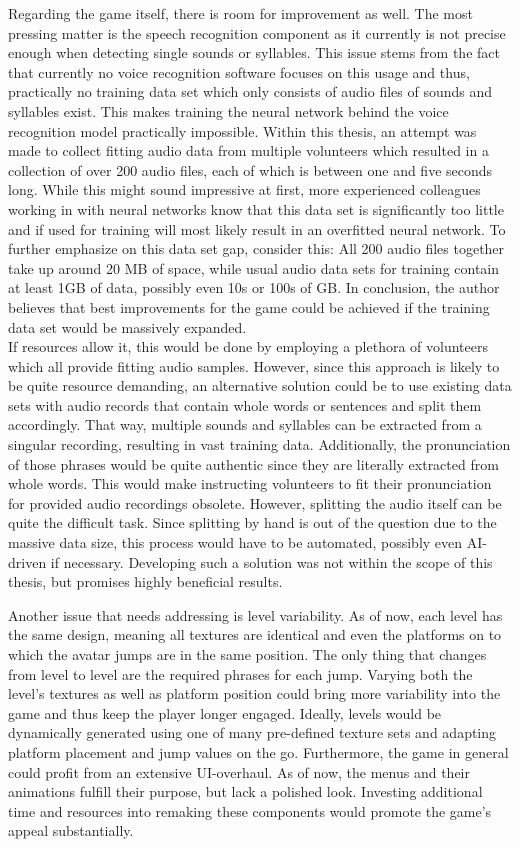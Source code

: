 \documentclass[draft,final]{vutinfth} %
\begin{document}
Regarding the game itself, there is room for improvement as well. The most pressing matter is the speech recognition component as it currently is not precise enough when detecting single sounds or syllables. This issue stems from the fact that currently no voice recognition software focuses on this usage and thus, practically no training data set which only consists of audio files of sounds and syllables exist. This makes training the neural network behind the voice recognition model practically impossible. Within this thesis, an attempt was made to collect fitting audio data from multiple volunteers which resulted in a collection of over 200 audio files, each of which is between one and five seconds long. While this might sound impressive at first, more experienced colleagues working in with neural networks know that this data set is significantly too little and if used for training will most likely result in an overfitted neural network. To further emphasize on this data set gap, consider this: All 200 audio files together take up around 20 MB of space, while usual audio data sets for training contain at least 1GB of data, possibly even 10s or 100s of GB. In conclusion, the author believes that best improvements for the game could be achieved if the training data set would be massively expanded. \\
If resources allow it, this would be done by employing a plethora of volunteers which all provide fitting audio samples. However, since this approach is likely to be quite resource demanding, an alternative solution could be to use existing data sets with audio records that contain whole words or sentences and split them accordingly. That way, multiple sounds and syllables can be extracted from a singular recording, resulting in vast training data. Additionally, the pronunciation of those phrases would be quite authentic since they are literally extracted from whole words. This would make instructing volunteers to fit their pronunciation for provided audio recordings obsolete. However, splitting the audio itself can be quite the difficult task. Since splitting by hand is out of the question due to the massive data size, this process would have to be automated, possibly even AI-driven if necessary. Developing such a solution was not within the scope of this thesis, but promises highly beneficial results.

Another issue that needs addressing is level variability. As of now, each level has the same design, meaning all textures are identical and even the platforms on to which the avatar jumps are in the same position. The only thing that changes from level to level are the required phrases for each jump. Varying both the level's textures as well as platform position could bring more variability into the game and thus keep the player longer engaged. Ideally, levels would be dynamically generated using one of many pre-defined texture sets and adapting platform placement and jump values on the go. Furthermore, the game in general could profit from an extensive UI-overhaul. As of now, the menus and their animations fulfill their purpose, but lack a polished look. Investing additional time and resources into remaking these components would promote the game's appeal substantially. \\
\end{document}
